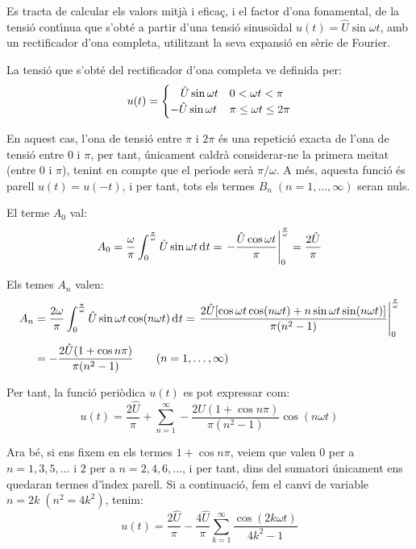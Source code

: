 \begin{exemple}

Es tracta de calcular els valors mitj\`{a} i efica\c{c}, i el factor d'ona
fonamental, de la tensi\'{o} cont\'{\i}nua que s'obt\'{e} a partir d'una tensi\'{o}
sinuso\"{\i}dal $u(t) = \hat{U} \sin\omega t$, amb un rectificador d'ona
completa, utilitzant la seva expansi\'{o} en s\`{e}rie de Fourier.

La tensi\'{o} que s'obt\'{e} del rectificador d'ona completa ve definida
per:
\[
u(t) = \begin{cases} \rule{3.2mm}{0pt}\hat{U} \sin\omega t & 0 < \omega t < \pi\\
       -\hat{U} \sin\omega t & \pi \leq \omega t \leq 2\pi \end{cases}
\]

En aquest cas, l'ona de tensi\'{o} entre $\pi$ i $2\pi$ \'{e}s una repetici\'{o}
exacta de l'ona de tensi\'{o} entre 0 i $\pi$, per tant, \'{u}nicament
caldr\`{a} considerar-ne la primera meitat (entre 0 i $\pi$), tenint en
compte que el per\'{\i}ode ser\`{a} $\pi/\omega$. A m\'{e}s, aquesta funci\'{o} \'{e}s
parell $u(t) = u(-t)$, i per tant, tots els termes
$B_n\;(n=1,\ldots,\infty)$ seran nuls.

El terme $A_0$ val:
\[
A_0 = \frac{\omega}{\pi} \int_0^{\frac{\pi}{\omega}} \hat{U} \sin
\omega t \diff t = \left. -\frac{\hat{U} \cos \omega t}{\pi}
\right|_0^{\frac{\pi}{\omega}} = \frac{2\hat{U}}{\pi}
\]

Els temes $A_n$ valen:
\[
\begin{split}
A_n &= \frac{2 \omega}{\pi} \int_0^{\frac{\pi}{\omega}} \hat{U} \sin
\omega t \cos(n \omega t)\diff t = \left. \frac{2 \hat{U}[ \cos
\omega t \cos (n \omega t) + n \sin \omega t \sin(n \omega
t)]}{\pi(n^2-1)} \right|_0^{\frac{\pi}{\omega}}\\[0.5ex]
&= -\frac{2\hat{U}(1+\cos n \pi)}{\pi(n^2-1)}
\qquad(n=1,\ldots,\infty)
\end{split}
\]

Per tant, la funci\'{o} peri\`{o}dica $u(t)$ es pot expressar com:
\[
    u(t) = \frac{2\hat{U}}{\pi} + \sum_{n=1}^\infty
     -\frac{2\hat{U}(1+\cos n \pi)}{\pi(n^2-1)} \cos(n \omega t)
\]

Ara b\'{e}, si ens fixem en els termes $1+\cos n \pi$, veiem que valen 0
per a $n=1,3,5,\ldots$ i 2 per a $n=2,4,6,\ldots$, i per tant, dins
del sumatori \'{u}nicament ens quedaran termes d'\'{\i}ndex parell. Si a
continuaci\'{o}, fem el canvi de variable $n=2k\;(n^2=4k^2)$, tenim:
\[
u(t) = \frac{2\hat{U}}{\pi} - \frac{4\hat{U}}{\pi} \sum_{k=1}^\infty
      \frac{\cos(2 k \omega t)}{4k^2-1}
\]


\end{exemple}
